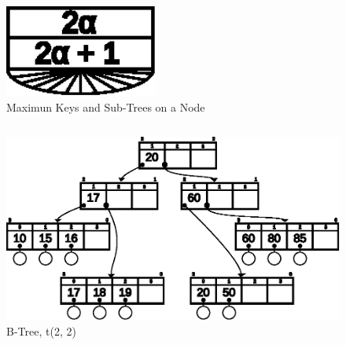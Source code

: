 \documentclass{beamer}
\begin{document}
\begin{frame}
\begin{columns}
\begin{column}{0.5\textwidth}
                \begin{figure}
                    \includegraphics[width=0.45\textwidth]{resources/made/max_node.eps}
                    \caption[]{Maximun Keys and Sub-Trees on a Node}
                \end{figure}
        \end{column}
    \end{columns}
    
    \framebreak

    \begin{figure}
        \centering
        \includegraphics[width=0.95\linewidth,keepaspectratio]{resources/made/mendivelso_a2_btree.eps}
        \caption[]{B-Tree, t(2, 2)}
    \end{figure}

    \framebreak


\end{frame}
\end{document}
